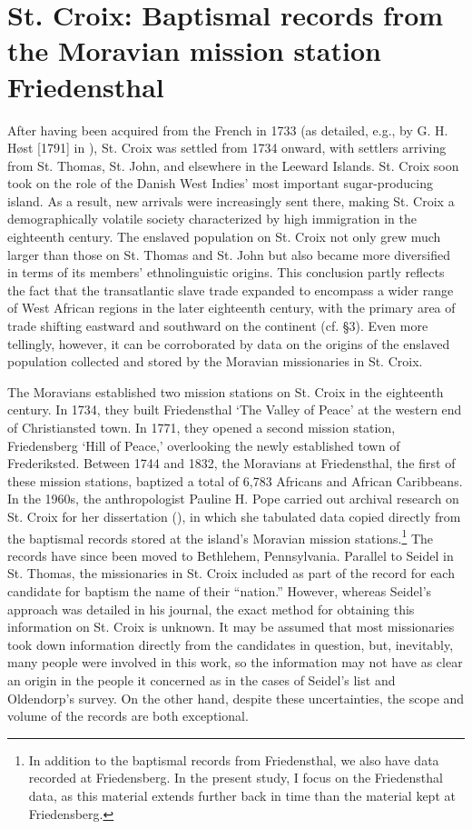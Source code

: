 \documentclass[output=paper,colorlinks,citecolor=brown]{langscibook}
\begin{document}
\section{St. Croix: Baptismal records from the Moravian mission station Friedensthal}

After having been acquired from the French in 1733 (as detailed, e.g., by G. H. Høst [1791] in \cite{Highfield_2018}), St. Croix was settled from 1734 onward, with settlers arriving from St. Thomas, St. John, and elsewhere in the Leeward Islands. St. Croix soon took on the role of the Danish West Indies’ most important sugar-producing island. As a result, new arrivals were increasingly sent there, making St. Croix a demographically volatile society characterized by high immigration in the eighteenth century. The enslaved population on St. Croix not only grew much larger than those on St. Thomas and St. John but also became more diversified in terms of its members' ethnolinguistic origins. This conclusion partly reflects the fact that the transatlantic slave trade expanded to encompass a wider range of West African regions in the later eighteenth century, with the primary area of trade shifting eastward and southward on the continent (cf. §3). Even more tellingly, however, it can be corroborated by data on the origins of the enslaved population collected and stored by the Moravian missionaries in St. Croix.

The Moravians established two mission stations on St. Croix in the eighteenth century. In 1734, they built Friedensthal `The Valley of Peace' at the western end of Christiansted town. In 1771, they opened a second mission station, Friedensberg `Hill of Peace,' overlooking the newly established town of Frederiksted. Between 1744 and 1832, the Moravians at Friedensthal, the first of these mission stations, baptized a total of 6,783 Africans and African Caribbeans. In the 1960s, the anthropologist Pauline H. Pope carried out archival research on St. Croix for her dissertation (\cite{Pope_1970}), in which she tabulated data copied directly from the baptismal records stored at the island’s Moravian mission stations.\footnote{In addition to the baptismal records from Friedensthal, we also have data recorded at Friedensberg. In the present study, I focus on the Friedensthal data, as this material extends further back in time than the material kept at Friedensberg.} The records have since been moved to Bethlehem, Pennsylvania. Parallel to Seidel in St. Thomas, the missionaries in St. Croix included as part of the record for each candidate for baptism the name of their ``nation.'' However, whereas Seidel's approach was detailed in his journal, the exact method for obtaining this information on St. Croix is unknown. It may be assumed that most missionaries took down information directly from the candidates in question, but, inevitably, many people were involved in this work, so the information may not have as clear an origin in the people it concerned as in the cases of Seidel's list and Oldendorp's survey. On the other hand, despite these uncertainties, the scope and volume of the records are both exceptional.
\end{document}
